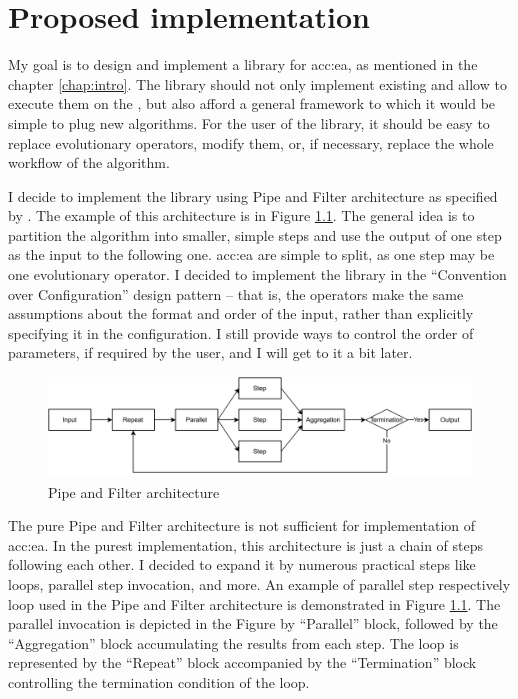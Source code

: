 \chapter{Proposed implementation}
\label{chap:impl}

My goal is to design and implement a library for \acrlong{acc:ea}, as mentioned in the chapter \ref{chap:intro}. The library should not only implement existing  and allow to execute them on the \gpuns, but also afford a general framework to which it would be simple to plug new algorithms. For the user of the library, it should be easy to replace evolutionary operators, modify them, or, if necessary, replace the whole workflow of the algorithm.

I decide to implement the library using Pipe and Filter architecture as specified by \citet{EnterpriseIntegrationPatterns}. The example of this architecture is in Figure \ref{fig:pipesandfilters}. The general idea is to partition the algorithm into smaller, simple steps and use the output of one step as the input to the following one. \acrshort{acc:ea} are simple to split, as one step may be one evolutionary operator. I decided to implement the library in the \enquote{Convention over Configuration} design pattern -- that is, the operators make the same assumptions about the format and order of the input, rather than explicitly specifying it in the configuration. I still provide ways to control the order of parameters, if required by the user, and I will get to it a bit later.

\begin{figure}
    \centering
    \includegraphics[width=\textwidth]{img/PipesAndFilters.pdf}
    \caption{Pipe and Filter architecture}
    \label{fig:pipesandfilters}
\end{figure}

The pure Pipe and Filter architecture is not sufficient for implementation of \acrshort{acc:ea}. In the purest implementation, this architecture is just a chain of steps following each other. I decided to expand it by numerous practical steps like loops, parallel step invocation, and more. An example of parallel step respectively loop used in the Pipe and Filter architecture is demonstrated in Figure \ref{fig:pipesandfilters}. The parallel invocation is depicted in the Figure by \enquote{Parallel} block, followed by the \enquote{Aggregation} block accumulating the results from each step. The loop is represented by the \enquote{Repeat} block accompanied by the \enquote{Termination} block controlling the termination condition of the loop.

